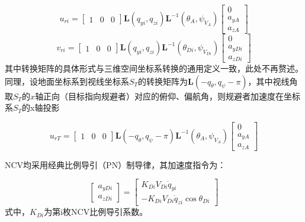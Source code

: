 \begin{equation}
\label{eq:6}
{u_{ri}} = \left[ {\begin{array}{*{20}{c}}
  1&0&0 
\end{array}} \right]{\mathbf{L}}({q_{yi}},{q_{zi}}){{\mathbf{L}}^{ - 1}}({\theta _A},{\psi _{{V_A}}})\left[ {\begin{array}{*{20}{c}}
  0 \\ 
  {{a_{yA}}} \\ 
  {{a_{zA}}} 
\end{array}} \right]
\end{equation}
\begin{equation}
\label{eq:7}
{v_{ri}} = \left[ {\begin{array}{*{20}{c}}
  1&0&0 
\end{array}} \right]{\mathbf{L}}({q_{yi}},{q_{zi}}){{\mathbf{L}}^{ - 1}}({\theta _{Di}},{\psi _{{V_{Di}}}})\left[ {\begin{array}{*{20}{c}}
  0 \\ 
  {{a_{yDi}}} \\ 
  {{a_{zDi}}} 
\end{array}} \right]
\end{equation}
其中转换矩阵的具体形式与三维空间坐标系转换的通用定义一致，此处不再赘述。同理，设地面坐标系到视线坐标系${S_T}$的转换矩阵为${\mathbf{L}}( - {q_\theta },{q_\psi } - \pi )$，其中视线角取${S_T}$的$x$轴正向（目标指向规避者）对应的俯仰、偏航角，则规避者加速度在坐标系${S_T}$的x轴投影

\begin{equation}
\label{eq:8}
{u_{rT}} = \left[ {\begin{array}{*{20}{c}}
  1&0&0 
\end{array}} \right]{\mathbf{L}}( - {q_\theta },{q_\psi } - \pi ){{\mathbf{L}}^{ - 1}}({\theta _A},{\psi _{{V_A}}})\left[ {\begin{array}{*{20}{c}}
  0 \\ 
  {{a_{yA}}} \\ 
  {{a_{zA}}} 
\end{array}} \right]
\end{equation}
\begin{assumption}
NCV均采用经典比例导引（PN）制导律，其加速度指令为：
\end{assumption}
\begin{equation}
\label{eq:9}
\left[ {\begin{array}{*{20}{c}}
  {{a_{yDi}}} \\ 
  {{a_{zDi}}} 
\end{array}} \right] = \left[ {\begin{array}{*{20}{c}}
  {{K_{Di}}{V_{Di}}{{\dot q}_{yi}}} \\ 
  { - {K_{Di}}{V_{Di}}{{\dot q}_{zi}}\cos {\theta _{Di}}} 
\end{array}} \right]
\end{equation}
式中，${K_{Di}}$为第i枚NCV比例导引系数。

